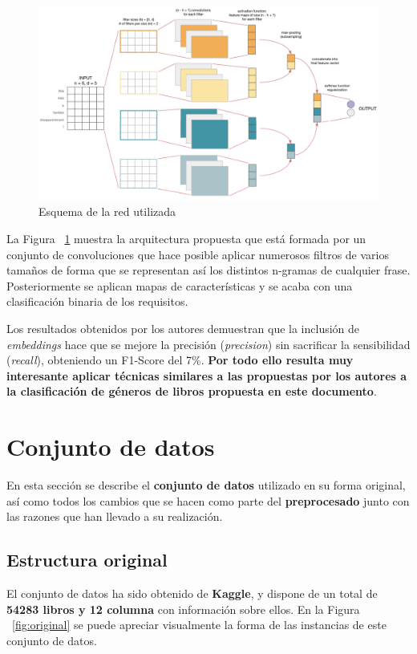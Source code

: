 \documentclass[12pt,a4paper, xcolor=table]{article}
\begin{document}
  \begin{figure}[!h]
    \centering
    \includegraphics[width=450px]{img/CNN Word2vect.png}
    \caption{Esquema de la red utilizada}
    \label{fig:esquemaRed}

  \end{figure}

\vspace{3mm}

La Figura ~\ref{fig:esquemaRed} muestra la arquitectura propuesta que está formada por un conjunto de convoluciones que hace posible aplicar numerosos filtros de varios tamaños de forma que se representan así los distintos n-gramas de cualquier frase. Posteriormente se aplican mapas de características y se acaba con una clasificación binaria de los requisitos.

\vspace{3mm}

Los resultados obtenidos por los autores demuestran que la inclusión de \textit{embeddings} hace que se mejore la precisión (\textit{precision}) sin sacrificar la sensibilidad (\textit{recall}), obteniendo un F1-Score del 7\%. \textbf{Por todo ello resulta muy interesante aplicar técnicas similares a las propuestas por los autores a la clasificación de géneros de libros propuesta en este documento}.

\newpage

\section{Conjunto de datos}
    En esta sección se describe el \textbf{conjunto de datos} utilizado en su forma original, así como todos los cambios que se hacen como parte del \textbf{preprocesado} junto con las razones que han llevado a su realización.

    \subsection{Estructura original}
    El conjunto de datos ha sido obtenido de \textbf{Kaggle}\cite{gbbe}, y dispone de un total de \textbf{54283 libros y 12 columna} con información sobre ellos. En la Figura ~\ref{fig:original} se puede apreciar visualmente la forma de las instancias de este conjunto de datos.
\end{document}
